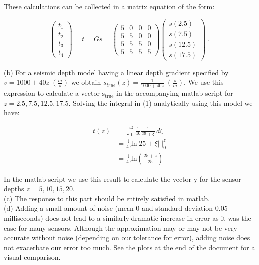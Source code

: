 \documentclass[11pt]{article}
\begin{document}
These calculations can be collected in a matrix equation of the form:

$$\begin{pmatrix}
t_1\\t_2\\t_3\\t_4
\end{pmatrix} = t = Gs = \begin{pmatrix}
5 & 0 & 0 &0\\
5 & 5 & 0& 0\\
5 & 5 & 5& 0\\
5 & 5 & 5 & 5 \end{pmatrix} \begin{pmatrix}
s(2.5) \\ s(7.5) \\ s(12.5) \\ s(17.5)
\end{pmatrix}
 \;.$$

(b) For a seismic depth model having a linear depth gradient specified by $v = 1000 + 40z \; (\frac{m}{s})$ we obtain $s_{true}(z) = \frac{1}{1000 + 40z} \; (\frac{s}{m})$. We use this expression to calculate a vector $\text{s}_{\text{true}}$ in the accompanying matlab script for $z = 2.5, 7.5, 12.5, 17.5$. Solving the integral in (1) analytically using this model we have:

\begin{align*}
t(z) &= \int_{0}^{z} \frac{1}{40}\frac{1}{25+\xi} \, d\xi\\
&=\frac{1}{40}\text{ln} |25 + \xi| \;\bigg|_{0}^{z} \\
&= \frac{1}{40} \text{ln} \left(\frac{25+z}{25}\right)
\end{align*}

In the matlab script we use this result to calculate the vector $\text{y}$ for the sensor depths $z = 5,10, 15, 20$. \\

(c) The response to this part should be entirely satisfied in matlab.\\

(d) Adding a small amount of noise (mean 0 and standard deviation $0.05$ milliseconds) does not lead to a similarly dramatic increase in error as it was the case for many sensors. Although the approximation may or may not be very accurate without noise (depending on our tolerance for error), adding noise does not exacerbate our error too much. See the plots at the end of the document for a visual comparison. \\
\end{document}
